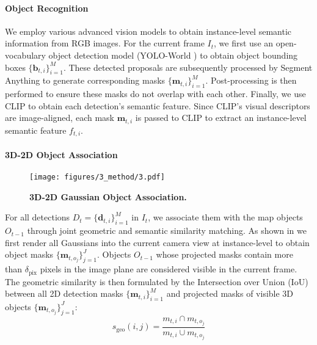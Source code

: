\paragraph{Object Recognition}
\label{para:obj_recogniton}
We employ various advanced vision models to obtain instance-level semantic information from RGB images. For the current frame $I_t$, we first use an open-vocabulary object detection model (YOLO-World \cite{cheng2024yoloworldrealtimeopenvocabularyobject}) to obtain object bounding boxes $ \{\textbf{b}_{t,i}\}_{i=1}^{M}$. These detected proposals are subsequently processed by Segment Anything \cite{kirillov2023segment} to generate corresponding masks $ \{\textbf{m}_{t,i}\}_{i=1}^{M}$. Post-processing is then performed to ensure these masks do not overlap with each other. Finally, we use CLIP \cite{radford2021learningtransferablevisualmodels} to obtain each detection's semantic feature. Since CLIP's visual descriptors are image-aligned, each mask $\textbf{m}_{t,i}$ is passed to CLIP to extract an instance-level semantic feature $f_{t,i}$.

\paragraph{3D-2D Object Association}
\label{para:obj_association}

\begin{figure}[t]
  \centering
  \texttt{[image: figures/3\_method/3.pdf]}
  \caption{\textbf{3D-2D Gaussian Object Association.}}
  \label{fig:Association}
\end{figure}

For all detections $ D_t = \{ \textbf{d}_{t,i} \}_{i=1}^{M} $ in $ I_t $, we associate them with the map objects $ O_{t-1} $  through joint geometric and semantic similarity matching. As shown in %
we first render all Gaussians into the current camera view at instance-level to obtain object masks  $\{\textbf{m}_{t,o_j}\}_{j=1}^{J}$. Objects $O_{t-1}$ whose projected masks contain more than $ \delta_{\text{pix}} $ pixels in the image plane are considered visible in the current frame. The geometric similarity is then formulated by the Intersection over Union (IoU) between all 2D detection masks $ \{\textbf{m}_{t,i}\}_{i=1}^{M}$ and projected masks of visible 3D objects $\{\textbf{m}_{t,o_j}\}_{j=1}^{J}$:
\begin{equation}
s_{\text{geo}}(i, j) = \frac{m_{t,i} \cap m_{t,o_j}}{m_{t,i} \cup m_{t,o_j}}
\end{equation}

